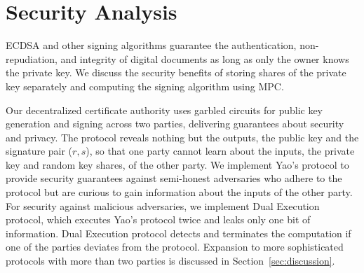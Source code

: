 \section{Security Analysis}\label{sec:security}


ECDSA and other signing algorithms guarantee the authentication, non-repudiation, and integrity of digital documents as long as only the owner knows the private key. We discuss the security benefits of storing shares of the private key separately and computing the signing algorithm using MPC. 

Our decentralized certificate authority uses garbled circuits for public key generation and signing across two parties, delivering guarantees about security and privacy. The protocol reveals nothing but the outputs, the public key and the signature pair ($r,s$), so that one party cannot learn about the inputs, the private key and random key shares, of the other party. We implement Yao's protocol to provide security guarantees against semi-honest adversaries who adhere to the protocol but are curious to gain information about the inputs of the other party. For security against malicious adversaries, we implement Dual Execution protocol, which executes Yao's protocol twice and leaks only one bit of information. Dual Execution protocol detects and terminates the computation if one of the parties deviates from the protocol. Expansion to more sophisticated protocols with more than two parties is discussed in Section~\ref{sec:discussion}.


